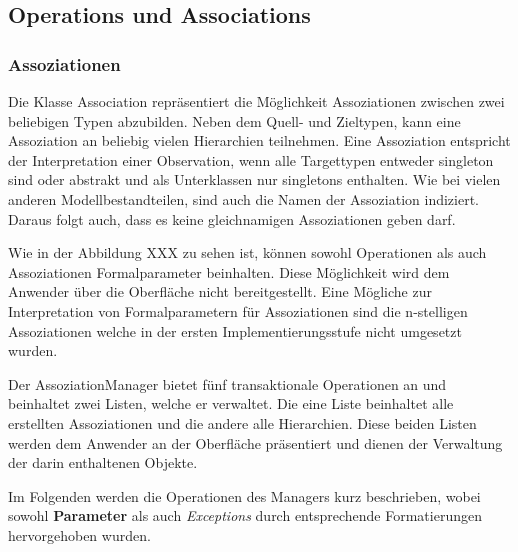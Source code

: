 \subsection{Operations und Associations}

\subsubsection{Assoziationen}

Die Klasse Association repräsentiert die Möglichkeit Assoziationen zwischen zwei beliebigen Typen abzubilden.
Neben dem Quell- und Zieltypen, kann eine Assoziation an beliebig vielen Hierarchien teilnehmen.
Eine Assoziation entspricht der Interpretation einer Observation, wenn alle Targettypen entweder singleton sind oder abstrakt und als Unterklassen nur singletons enthalten.
Wie bei vielen anderen Modellbestandteilen, sind auch die Namen der Assoziation indiziert. Daraus folgt auch, dass es keine gleichnamigen 
Assoziationen geben darf.

Wie in der Abbildung XXX zu sehen ist, können sowohl Operationen als auch Assoziationen Formalparameter beinhalten. Diese Möglichkeit wird
dem Anwender über die Oberfläche nicht bereitgestellt. Eine Mögliche zur Interpretation von Formalparametern für Assoziationen sind die n-stelligen Assoziationen
welche in der ersten Implementierungsstufe nicht umgesetzt wurden.

 \newline
Der AssoziationManager bietet fünf transaktionale Operationen an und beinhaltet zwei Listen, welche er verwaltet.
Die eine Liste beinhaltet alle erstellten Assoziationen und die andere alle Hierarchien. Diese beiden Listen werden dem Anwender an der 
Oberfläche präsentiert und dienen der Verwaltung der darin enthaltenen Objekte.

Im Folgenden werden die Operationen des Managers kurz beschrieben, wobei sowohl \textbf{Parameter} als auch \emph{Exceptions} durch entsprechende Formatierungen hervorgehoben wurden.

